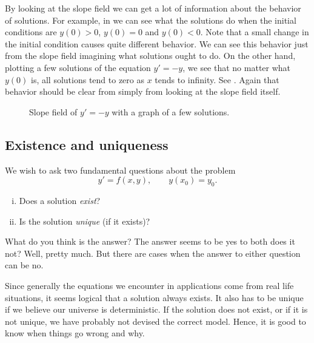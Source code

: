 \documentclass[12pt]{book}
\begin{document}
By looking at the slope field we can get a lot of information
about the behavior of
solutions.  For
example, in  we can see what the solutions do when the initial conditions
are $y(0) > 0$, $y(0) = 0$ and $y(0) < 0$.
Note that a small change in the
initial condition causes quite different behavior.
We can see this behavior just
from the slope field imagining what solutions ought to do.
On the other hand, plotting a few solutions of the equation
$y' = -y$,
we see that no matter what $y(0)$ is, all solutions tend to zero as $x$
tends to infinity.
See .  Again that behavior should be clear from simply
from looking at the slope field itself.

\begin{figure}[h!t]
\begin{center}
\capstart
{}
\caption{Slope field of $y' = -y$ with a graph of a few solutions.\label{1.3:fig3}}
\end{center}
\end{figure}

\subsection{Existence and uniqueness}

We wish to ask two fundamental questions about the problem
\begin{equation*}
y' = f(x,y), \qquad y(x_0) = y_0.
\end{equation*}
\begin{enumerate}[(i)]
\item Does a solution \emph{exist}?
\item Is the solution \emph{unique} (if it exists)?
\end{enumerate}

What do you think is the answer?
The answer seems to be yes to both does it not?  Well, pretty much.  But there
are cases when the answer to either question can be no.

Since generally the equations we encounter in applications
come from real life situations, it seems
logical that a solution always exists.
It also has to be unique if we believe our
universe is deterministic.  If the solution does not exist, or if it is
not unique, we have
probably not devised the correct model.  Hence, it is good to know
when things go wrong and why.
\end{document}
